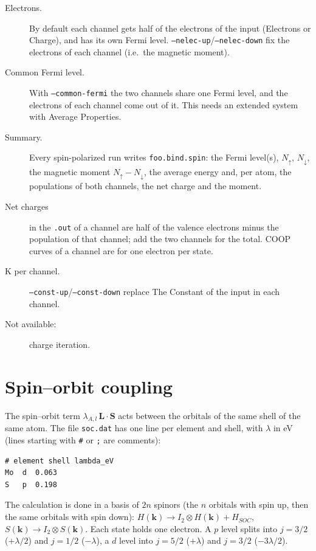 \begin{description}
\item[Electrons.] By default each channel gets half of the electrons of
  the input ({\sf Electrons} or {\sf Charge}), and has its own Fermi
  level. {\tt --nelec-up}/{\tt --nelec-down} fix the electrons of each
  channel (i.e.\ the magnetic moment).
\item[Common Fermi level.] With {\tt --common-fermi} the two channels
  share one Fermi level, and the electrons of each channel come out of
  it. This needs an extended system with {\sf Average Properties}.
\item[Summary.] Every spin-polarized run writes {\tt foo.bind.spin}: the
  Fermi level(s), $N_\uparrow$, $N_\downarrow$, the magnetic moment
  $N_\uparrow-N_\downarrow$, the average energy and, per atom, the
  populations of both channels, the net charge and the moment.
\item[Net charges] in the {\tt .out} of a channel are half of the
  valence electrons minus the population of that channel; add the two
  channels for the total. COOP curves of a channel are for one electron
  per state.
\item[K per channel.] {\tt --const-up}/{\tt --const-down} replace
  {\sf The Constant} of the input in each channel.
\item[Not available:] charge iteration.
\end{description}

\section{Spin--orbit coupling}


The spin--orbit term $\lambda_{A,l}\,\mathbf{L}\cdot\mathbf{S}$ acts
between the orbitals of the same shell of the same atom. The file
{\tt soc.dat} has one line per element and shell, with $\lambda$ in eV
(lines starting with {\tt \#} or {\tt ;} are comments):

\shrinkspacing
\begin{verbatim}
# element shell lambda_eV
Mo  d  0.063
S   p  0.198
\end{verbatim}
\resumespacing

The calculation is done in a basis of $2n$ spinors (the $n$ orbitals
with spin up, then the same orbitals with spin down):
$H(\mathbf{k}) \to I_2\otimes H(\mathbf{k}) + H_{SOC}$,
$S(\mathbf{k}) \to I_2\otimes S(\mathbf{k})$. Each state holds one
electron. A $p$ level splits into $j=3/2$ ($+\lambda/2$) and $j=1/2$
($-\lambda$), a $d$ level into $j=5/2$ ($+\lambda$) and $j=3/2$
($-3\lambda/2$).

